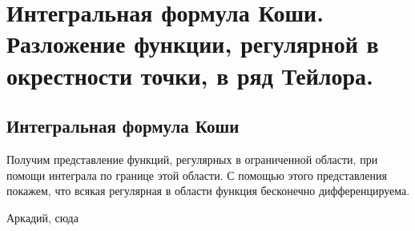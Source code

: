 \chapter{Интегральная формула Коши. Разложение функции, регулярной в окрестности точки, в ряд Тейлора.}
\section{Интегральная формула Коши}

Получим представление функций, регулярных в ограниченной области, при помощи интеграла по границе этой области. С помощью этого представления покажем, что всякая регулярная в области функция бесконечно дифференцируема.
\begin{exmpl}
Аркадий, сюда
\end{exmpl}

